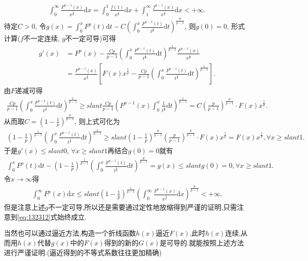 \documentclass[../../main.tex]{subfiles}
\begin{document}
\begin{note}
\begin{align*}
\int_0^{\infty}{\frac{F^{p-1}\left( x \right)}{x^{\frac{1}{p}}}\mathrm{d}x}=\int_0^1{\frac{f\left( 1 \right)}{x^{\frac{1}{p}}}\mathrm{d}x}+\int_1^{\infty}{\frac{f^{p-1}\left( x \right)}{x^{\frac{1}{p}}}\mathrm{d}x}<+\infty .
\end{align*}
待定$C>0$, 令$g\left( x \right) =\int_0^x{F^p\left( t \right)}\mathrm{d}t-C\left( \int_0^x{\frac{F^{p-1}\left( t \right)}{t^{\frac{1}{p}}}\mathrm{d}t} \right) ^{\frac{p}{p-1}}$, 则$g\left( 0 \right) =0$, 形式计算($f$不一定连续, $g$不一定可导)可得
\begin{align*}
g' \left( x \right) &=F^p\left( x \right) -\frac{Cp}{p-1}\left( \int_0^x{\frac{F^{p-1}\left( t \right)}{t^{\frac{1}{p}}}\mathrm{d}t} \right) ^{\frac{1}{p-1}}\frac{F^{p-1}\left( x \right)}{x^{\frac{1}{p}}}\\
&=\frac{F^{p-1}\left( x \right)}{x^{\frac{1}{p}}}\left[ F\left( x \right) x^{\frac{1}{p}}-\frac{Cp}{p-1}\left( \int_0^x{\frac{F^{p-1}\left( t \right)}{t^{\frac{1}{p}}}\mathrm{d}t} \right) ^{\frac{1}{p-1}} \right] .
\end{align*}
由$F$递减可得
\begin{align*}
\frac{Cp}{p-1}\left( \int_0^x{\frac{F^{p-1}\left( t \right)}{t^{\frac{1}{p}}}\mathrm{d}t} \right) ^{\frac{1}{p-1}}\geqslant slant \frac{Cp}{p-1}\left( F^{p-1}\left( x \right) \int_0^x{\frac{1}{t^{\frac{1}{p}}}\mathrm{d}t} \right) ^{\frac{1}{p-1}}=C\left( \frac{p}{p-1} \right) ^{\frac{p}{p-1}}\cdot F\left( x \right) x^{\frac{1}{p}}.
\end{align*}
从而取$C=\left( 1-\frac{1}{p} \right) ^{\frac{p}{p-1}}$, 则上式可化为
\begin{align}
\left( 1-\frac{1}{p} \right) ^{\frac{1}{p-1}}\left( \int_0^x{\frac{F^{p-1}\left( t \right)}{t^{\frac{1}{p}}}\mathrm{d}t} \right) ^{\frac{1}{p-1}}\geqslant slant \left( 1-\frac{1}{p} \right) ^{\frac{p}{p-1}}\left( \frac{p}{p-1} \right) ^{\frac{p}{p-1}}\cdot F\left( x \right) x^{\frac{1}{p}}=F\left( x \right) x^{\frac{1}{p}},\forall x\geqslant slant 1.\label{eq:132312}
\end{align}
于是$g' \left( x \right) \leqslant slant 0$, $\forall x\geqslant slant 1$再结合$g\left( 0 \right) =0$就有
\begin{align*}
\int_0^x{F^p\left( t \right)}\mathrm{d}t-\left( 1-\frac{1}{p} \right) ^{\frac{1}{p-1}}\left( \int_0^x{\frac{F^{p-1}\left( t \right)}{t^{\frac{1}{p}}}\mathrm{d}t} \right) ^{\frac{p}{p-1}}=g\left( x \right) \leqslant slant g\left( 0 \right) =0,\forall x\geqslant slant 1.
\end{align*}
令$x\rightarrow \infty$得
\begin{align*}
\int_0^{\infty}{F^p\left( x \right)}\mathrm{d}x\leqslant slant \left( 1-\frac{1}{p} \right) ^{\frac{1}{p-1}}\left( \int_0^{\infty}{\frac{F^{p-1}\left( x \right)}{x^{\frac{1}{p}}}\mathrm{d}x} \right) ^{\frac{p}{p-1}}<+\infty .
\end{align*}
但是注意上述$g$不一定可导,所以还是需要通过定性地放缩得到严谨的证明,只需注意到\eqref{eq:132312}式始终成立.

当然也可以通过逼近方法,构造一个折线函数$h(x)$逼近$F(x)$,此时$h(x)$连续,从而用$h(x)$代替$g(x)$中的$F(x)$得到的新的$G(x)$是可导的.就能按照上述方法进行严谨证明.(逼近得到的不等式系数往往更加精确)
\end{note}
\end{document}
